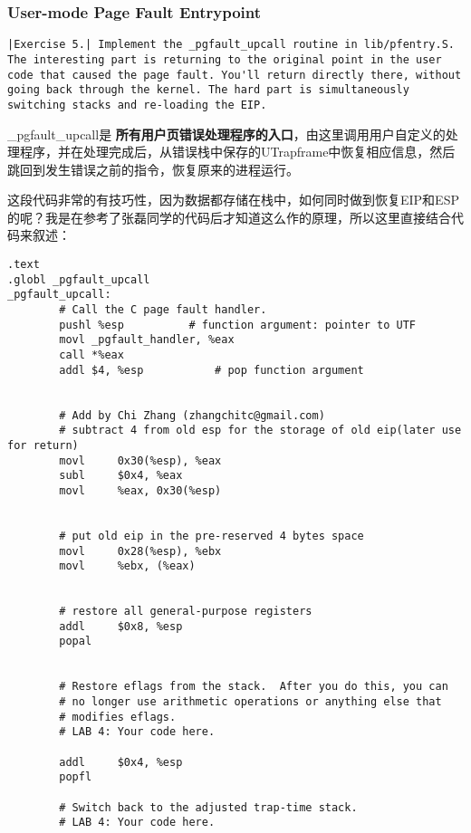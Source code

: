 \documentclass{article}
\newcommand{\highlight}[1]{{\bfseries \color{red}  #1}}
\begin{document}
\begin{CJK*}{UTF8}{gkai}
\subsubsection{User-mode Page Fault Entrypoint}

\newpage

\begin{lstlisting}[style=exercise]
|Exercise 5.| Implement the _pgfault_upcall routine in lib/pfentry.S. The interesting part is returning to the original point in the user code that caused the page fault. You'll return directly there, without going back through the kernel. The hard part is simultaneously switching stacks and re-loading the EIP.
\end{lstlisting}

\_pgfault\_upcall是\highlight{所有用户页错误处理程序的入口}，由这里调用用户自定义的处理程序，并在处理完成后，从错误栈中保存的UTrapframe中恢复相应信息，然后跳回到发生错误之前的指令，恢复原来的进程运行。

这段代码非常的有技巧性，因为数据都存储在栈中，如何同时做到恢复EIP和ESP的呢？我是在参考了张磊同学的代码后才知道这么作的原理，所以这里直接结合代码来叙述：

\begin{lstlisting}[style=acode, title={\scriptsize \ttfamily \bfseries lib/pfentry.S}]
.text
.globl _pgfault_upcall
_pgfault_upcall:
        # Call the C page fault handler.
        pushl %esp			# function argument: pointer to UTF
        movl _pgfault_handler, %eax
        call *%eax
        addl $4, %esp			# pop function argument
	

        # Add by Chi Zhang (zhangchitc@gmail.com)
        # subtract 4 from old esp for the storage of old eip(later use for return)
        movl     0x30(%esp), %eax
        subl     $0x4, %eax
        movl     %eax, 0x30(%esp)


        # put old eip in the pre-reserved 4 bytes space
        movl     0x28(%esp), %ebx
        movl     %ebx, (%eax)

    
        # restore all general-purpose registers
        addl     $0x8, %esp
        popal


        # Restore eflags from the stack.  After you do this, you can
        # no longer use arithmetic operations or anything else that
        # modifies eflags.
        # LAB 4: Your code here.

        addl     $0x4, %esp
        popfl

        # Switch back to the adjusted trap-time stack.
        # LAB 4: Your code here.


\end{lstlisting}
\end{CJK*}
\end{document}
